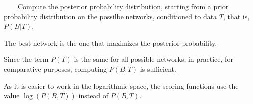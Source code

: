 ~~~~Compute the posterior probability distribution, starting from a prior probability distribution on the possilbe networks, conditioned to data $T$, that is, $P(B|T)$.

The best network is the one that maximizes the posterior probability.

Since the term $P(T)$ is the same for all possible networks, in practice, for comparative purposes, computing $P(B, T)$ is sufficient.

As it is easier to work in the logarithmic space, the scoring functions use the value $\log(P(B,T))$ instead of $P(B,T)$.
